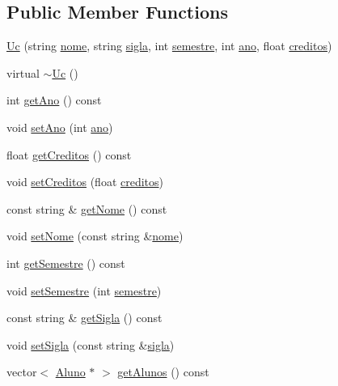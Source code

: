 \subsection*{Public Member Functions}
\begin{DoxyCompactItemize}
\item 
\hyperlink{class_uc_aca20c83c3003e9279c141afed4a63d29}{Uc} (string \hyperlink{class_uc_af2971baa3ea283ba5fec29170de3fbe9}{nome}, string \hyperlink{class_uc_a5d6fb389c3634d6c4f4b92877e4e0e39}{sigla}, int \hyperlink{class_uc_a5e91075b035d68f536d35683c50c9bae}{semestre}, int \hyperlink{class_uc_aefaa6dc015733603451294d3e2efaa83}{ano}, float \hyperlink{class_uc_a0d64adeb7bc81560097dc7c6e9e2dff1}{creditos})
\item 
virtual \hyperlink{class_uc_a3990e03dc5dd679cfadd02514b318d42}{$\sim$\+Uc} ()
\item 
int \hyperlink{class_uc_a8208b7eed44e19a08d92442ad8202dd0}{get\+Ano} () const
\item 
void \hyperlink{class_uc_a4c6b722e1abbeab671c84d9b8fb4937b}{set\+Ano} (int \hyperlink{class_uc_aefaa6dc015733603451294d3e2efaa83}{ano})
\item 
float \hyperlink{class_uc_aab235a5055e1a3801df9032d8e73225a}{get\+Creditos} () const
\item 
void \hyperlink{class_uc_a40f0de8ac22eac7b670d715cd242587f}{set\+Creditos} (float \hyperlink{class_uc_a0d64adeb7bc81560097dc7c6e9e2dff1}{creditos})
\item 
const string \& \hyperlink{class_uc_a27188d9339641df1be60e14afbead17e}{get\+Nome} () const
\item 
void \hyperlink{class_uc_a278e8288a1aa28daea1fc851348edc88}{set\+Nome} (const string \&\hyperlink{class_uc_af2971baa3ea283ba5fec29170de3fbe9}{nome})
\item 
int \hyperlink{class_uc_a68a645144f76f245b73bdaaa2575ea7c}{get\+Semestre} () const
\item 
void \hyperlink{class_uc_a4185161e311af207eb39ce8ae8070f91}{set\+Semestre} (int \hyperlink{class_uc_a5e91075b035d68f536d35683c50c9bae}{semestre})
\item 
const string \& \hyperlink{class_uc_a16ccd7563b4be5ef6d15d28ea2293d50}{get\+Sigla} () const
\item 
void \hyperlink{class_uc_aed13eb6a728b836ea6f50d9963220f8d}{set\+Sigla} (const string \&\hyperlink{class_uc_a5d6fb389c3634d6c4f4b92877e4e0e39}{sigla})
\item 
vector$<$ \hyperlink{class_aluno}{Aluno} $\ast$ $>$ \hyperlink{class_uc_aed4df59cb5431e64486d6ac45efad4fc}{get\+Alunos} () const

\end{DoxyCompactItemize}
